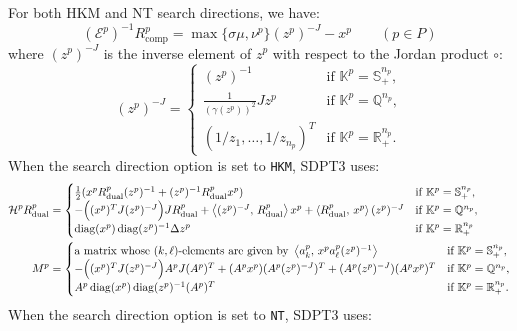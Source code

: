 For both HKM and NT search directions, we have:
\begin{equation}
    (\mathcal{E}^p)^{-1}R^p_{\text{comp}} = \max\{\sigma\mu, \nu^p\}(z^p)^{-J} - x^p \qquad (p \in P)
    \label{eq:Einv_Rcomp}
\end{equation}
where $(z^p)^{-J}$ is the inverse element of $z^p$ with respect to the Jordan product $\circ$:
\[
    (z^p)^{-J} = \begin{cases}
        (z^p)^{-1} & \text{if } \mathbb{K}^p = \mathbb{S}^{n_p}_+, \\
        \frac{1}{(\gamma(z^p))^2} J z^p & \text{if } \mathbb{K}^p = \mathbb{Q}^{n_p}, \\
        (1/z_1, \ldots, 1/z_{n_p})^T & \text{if } \mathbb{K}^p = \mathbb{R}^{n_p}_+.
    \end{cases}
\]
\medskip
When the search direction option is set to \texttt{HKM}, SDPT3 uses:
\begin{align}
    \mathcal{H}^p R^p_{\text{dual}} &= \begin{cases}
        \frac{1}{2}(x^p R^p_{\text{dual}} (z^p)^{-1} + (z^p)^{-1} R^p_{\text{dual}} x^p) & \text{if } \mathbb{K}^p = \mathbb{S}^{n_p}_+,\\
        - \Big( (x^p)^T J (z^p)^{-J} \Big) J R^p_{\text{dual}} + \left\langle (z^p)^{-J}, \, R^p_{\text{dual}} \right\rangle x^p + \left\langle R^p_{\text{dual}}, \, x^p \right\rangle (z^p)^{-J} & \text{if } \mathbb{K}^p = \mathbb{Q}^{n_p},\\
        \operatorname{diag}(x^p) \operatorname{diag}(z^p)^{-1} \Delta z^p & \text{if } \mathbb{K}^p = \mathbb{R}^{n_p}_+
    \end{cases} \label{eq:HKM_HRd}\\
    M^p &= \begin{cases} 
        \text{a matrix whose $(k,\ell)$-elements are given by } \left\langle a^p_k, \, x^p a^p_\ell (z^p)^{-1} \right\rangle & \text{if } \mathbb{K}^p = \mathbb{S}^{n_p}_+, \\
        -\Big( (x^p)^T J (z^p)^{-J} \Big) A^p J (A^p)^T + (A^p x^p)(A^p (z^p)^{-J})^T + (A^p (z^p)^{-J})(A^p x^p)^T& \text{if } \mathbb{K}^p = \mathbb{Q}^{n_p}, \\
        A^p \operatorname{diag}(x^p) \operatorname{diag}(z^p)^{-1} (A^p)^T & \text{if } \mathbb{K}^p = \mathbb{R}^{n_p}_+.
    \end{cases}
\end{align}
\medskip
When the search direction option is set to \texttt{NT}, SDPT3 uses:

